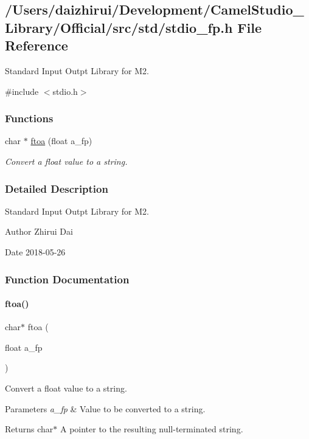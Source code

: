 \hypertarget{a00104}{}\subsection{/\+Users/daizhirui/\+Development/\+Camel\+Studio\+\_\+\+Library/\+Official/src/std/stdio\+\_\+fp.h File Reference}
\label{a00104}


Standard Input Outpt Library for M2.  


{\ttfamily \#include $<$stdio.\+h$>$}\newline
\subsubsection*{Functions}
\begin{DoxyCompactItemize}
\item 
char $\ast$ \mbox{\hyperlink{a00104_ad84834e66c9593acc3052b51d8fd783e}{ftoa}} (float a\+\_\+fp)
\begin{DoxyCompactList}\small\item\em Convert a float value to a string. \end{DoxyCompactList}\end{DoxyCompactItemize}


\subsubsection{Detailed Description}
Standard Input Outpt Library for M2. 

\begin{DoxyAuthor}{Author}
Zhirui Dai 
\end{DoxyAuthor}
\begin{DoxyDate}{Date}
2018-\/05-\/26 
\end{DoxyDate}


\subsubsection{Function Documentation}
\mbox{\label{a00104_ad84834e66c9593acc3052b51d8fd783e}} 
\paragraph{\texorpdfstring{ftoa()}{ftoa()}}
{\footnotesize\ttfamily char$\ast$ ftoa (\begin{DoxyParamCaption}\item[{float}]{a\+\_\+fp }\end{DoxyParamCaption})}



Convert a float value to a string. 


\begin{DoxyParams}{Parameters}
{\em a\+\_\+fp} & Value to be converted to a string. \\
\hline
\end{DoxyParams}
\begin{DoxyReturn}{Returns}
char$\ast$ A pointer to the resulting null-\/terminated string. 
\end{DoxyReturn}
